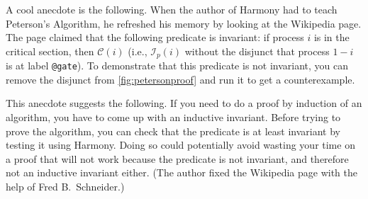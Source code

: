 \documentclass{report}
\begin{document}
A cool anecdote is the following.  When the author of Harmony had to teach
Peterson's Algorithm, he refreshed his memory by looking at the Wikipedia
page.  The page claimed that the following predicate is invariant:
if process $i$ is in the critical section, then $\mathcal{C}(i)$ (i.e.,
$\mathcal{I}_p(i)$ without the disjunct that process $1-i$ is at label \texttt{@gate}).
To demonstrate that this predicate is not invariant, you can remove the
disjunct from \autoref{fig:petersonproof} and run it to get a
counterexample.

This anecdote suggests the following.  If you need to do a proof by induction
of an algorithm, you have to come up with an inductive invariant.
Before trying to prove the algorithm, you can check that the predicate is
at least invariant by testing it using Harmony.  Doing so could potentially
avoid wasting your time on a proof that will not work because the
predicate is not invariant, and therefore not an inductive invariant either.
(The author fixed the Wikipedia page with the help of Fred B.~Schneider.)
\end{document}
